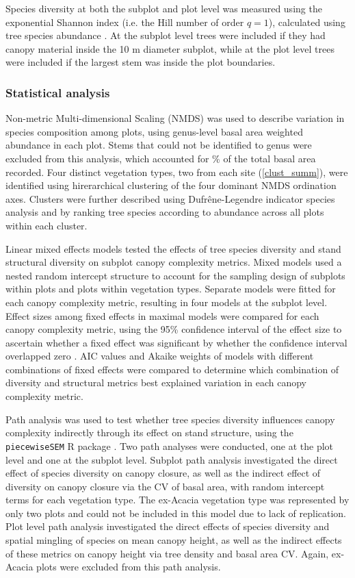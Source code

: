 \documentclass[11pt,a4paper]{article}
\begin{document}
Species diversity at both the subplot and plot level was measured using the exponential Shannon index (i.e. the Hill number of order $q=1$), calculated using tree species abundance \citep{Jost2006}. At the subplot level trees were included if they had canopy material inside the 10 m diameter subplot, while at the plot level trees were included if the largest stem was inside the plot boundaries.

\subsubsection{Statistical analysis}

Non-metric Multi-dimensional Scaling (NMDS) was used to describe variation in species composition among plots, using genus-level basal area weighted abundance in each plot. Stems that could not be identified to genus were excluded from this analysis, which accounted for \perIndet{}\% of the total basal area recorded. Four distinct vegetation types, two from each site (\autoref{clust_summ}), were identified using hirerarchical clustering of the four dominant NMDS ordination axes. Clusters were further described using Dufr\^{e}ne-Legendre indicator species analysis and by ranking tree species according to abundance across all plots within each cluster. 

Linear mixed effects models tested the effects of tree species diversity and stand structural diversity on subplot canopy complexity metrics. Mixed models used a nested random intercept structure to account for the sampling design of subplots within plots and plots within vegetation types. Separate models were fitted for each canopy complexity metric, resulting in four models at the subplot level. Effect sizes among fixed effects in maximal models were compared for each canopy complexity metric, using the 95\% confidence interval of the effect size to ascertain whether a fixed effect was significant by whether the confidence interval overlapped zero \citep{Nakagawa2007}. AIC values and Akaike weights of models with different combinations of fixed effects were compared to determine which combination of diversity and structural metrics best explained variation in each canopy complexity metric. 

Path analysis was used to test whether tree species diversity influences canopy complexity indirectly through its effect on stand structure, using the \texttt{piecewiseSEM} R package \citep{piecewiseSEM}. Two path analyses were conducted, one at the plot level and one at the subplot level. Subplot path analysis investigated the direct effect of species diversity on canopy closure, as well as the indirect effect of diversity on canopy closure via the CV of basal area, with random intercept terms for each vegetation type. The ex-Acacia vegetation type was represented by only two plots and could not be included in this model due to lack of replication. Plot level path analysis investigated the direct effects of species diversity and spatial mingling of species on mean canopy height, as well as the indirect effects of these metrics on canopy height via tree density and basal area CV. Again, ex-Acacia plots were excluded from this path analysis.
\end{document}
